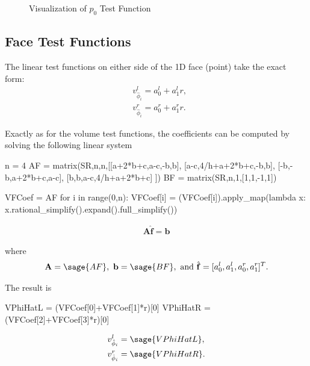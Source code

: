 \documentclass{article}
\numberwithin{equation}{section}
\newcommand{\vect}[1]{\mathbf{{#1}}}
\newcommand{\mat}[1]{\mathbf{{#1}}}
\begin{document}
\begin{figure}[!ht]
      \centering%
      \caption{Visualization of $p_0$ Test Function}
      \label{fig:test_vol_p0}
\end{figure}

\subsection{Face Test Functions}

The linear test functions on either side of the 1D face (point) take the exact form:
\begin{align}
& v_{\hat{\phi}_i}^l = a_0^l + a_1^l r,\\
& v_{\hat{\phi}_i}^r = a_0^r + a_1^r r.
\end{align}

Exactly as for the volume test functions, the coefficients can be computed by solving the following linear system

\begin{sagesilent}
n = 4
AF = matrix(SR,n,n,[[a+2*b+c,a-c,-b,b],
                    [a-c,4/h+a+2*b+c,-b,b],
                    [-b,-b,a+2*b+c,a-c],
                    [b,b,a-c,4/h+a+2*b+c]
                   ])
BF = matrix(SR,n,1,[1,1,-1,1])

VFCoef = AF\BF
for i in range(0,n):
    VFCoef[i] = (VFCoef[i]).apply_map(lambda x: x.rational_simplify().expand().full_simplify())
\end{sagesilent}

\begin{align}
\mat{A} \hat{\vect{f}} = \vect{b}
\end{align}

where
\begin{align}
\mat{A} = \sage{AF},\ \vect{b} = \sage{BF},\ \text{and}\ \hat{\vect{f}} = [a_0^l,a_1^l,a_0^r,a_1^r]^T.
\end{align}

The result is
\begin{sagesilent}
VPhiHatL = (VFCoef[0]+VFCoef[1]*r)[0]
VPhiHatR = (VFCoef[2]+VFCoef[3]*r)[0]
\end{sagesilent}

\begin{align}
& v_{\hat{\phi}_i}^l = \sage{VPhiHatL}, \\
& v_{\hat{\phi}_i}^r = \sage{VPhiHatR}.
\end{align}
\end{document}
